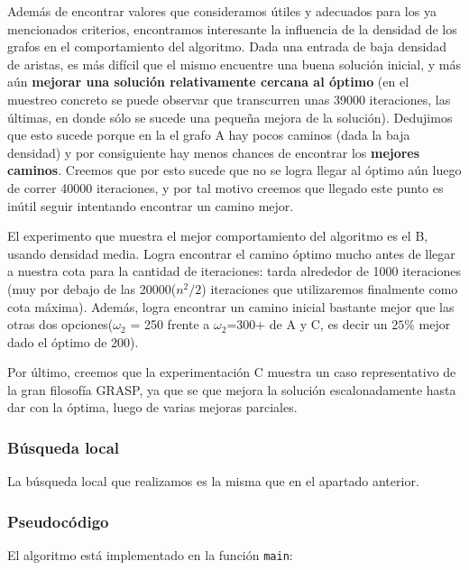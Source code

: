 Además de encontrar valores que consideramos útiles y adecuados para los ya mencionados criterios, encontramos interesante la influencia de la densidad de los grafos en el comportamiento del algoritmo. Dada una entrada de baja densidad de aristas, es más difícil que el mismo encuentre una buena solución inicial, y más aún \textbf{mejorar una solución relativamente cercana al óptimo} (en el muestreo concreto se puede observar que transcurren unas 39000 iteraciones, las últimas, en donde sólo se sucede una pequeña mejora de la solución). Dedujimos que esto sucede porque en la el grafo A hay pocos caminos (dada la baja densidad) y por consiguiente hay menos chances de encontrar los \textbf{mejores caminos}. Creemos que por esto sucede que no se logra llegar al óptimo aún luego de correr 40000 iteraciones, y por tal motivo creemos que llegado este punto es inútil seguir intentando encontrar un camino mejor.

El experimento que muestra el mejor comportamiento del algoritmo es el B, usando densidad media. Logra encontrar el camino óptimo mucho antes de llegar a nuestra cota para la cantidad de iteraciones: tarda alrededor de 1000 iteraciones (muy por debajo de las 20000($n^2 / 2$) iteraciones que utilizaremos finalmente como cota máxima). Además, logra encontrar un camino inicial bastante mejor que las otras dos opciones($\omega_2$ = 250 frente a $\omega_2$=300+ de A y C, es decir un $25\%$ mejor dado el óptimo de 200). 

Por último, creemos que la experimentación C muestra un caso representativo de la gran filosofía GRASP, ya que se que mejora la solución escalonadamente hasta dar con la óptima, luego de varias mejoras parciales.


\subsubsection{Búsqueda local}

La búsqueda local que realizamos es la misma que en el apartado anterior.

\subsubsection{Pseudocódigo}

El algoritmo está implementado en la función \texttt{main}:

